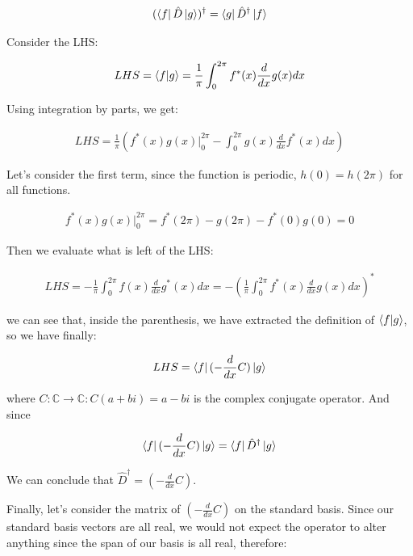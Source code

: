 \documentclass{article}
\begin{document}
\begin{align*}
(\bra{f} {\hat{D}} \ket{g})^{\dagger} = \bra{g}{\hat{D}}^{\dagger} \ket{f} 
\end{align*}

Consider the LHS:

\begin{align*}
LHS = \bra{f}\ket{g} = \frac{1}{\pi} \int_{0}^{2\pi}  f^*(x) \frac{d}{dx} g(x) dx
\end{align*}

Using integration by parts, we get:

\begin{align*}
LHS = \frac{1}{\pi} ( f^*(x) g(x) \Big|^{2\pi}_{0} -  \int^{2\pi}_{0} g(x) \frac{d}{dx} f^*(x) dx)
\end{align*}

Let's consider the first term, since the function is periodic, $h(0) = h(2\pi)$ for all functions.

\begin{align*}
f^*(x) g(x) \Big|^{2\pi}_{0} = f^*( 2\pi) - g(2\pi) - f^*(0) g(0) = 0
\end{align*}

Then we evaluate what is left of the LHS:

\begin{align*}
LHS = - \frac{1}{\pi} \int^{2\pi}_{0} f(x) \frac{d}{dx} g^*(x) dx = - (\frac{1}{\pi} \int^{2\pi}_{0} f^*(x) \frac{d}{dx} g(x) dx)^*
\end{align*}

we can see that, inside the parenthesis, we have extracted the definition of $\bra{f}\ket{g}$, so we have finally:

\begin{align*}
LHS = \bra{f} (-\frac{d}{dx} C) \ket{g}
\end{align*}

where $C: \mathbb{C} \to \mathbb{C} : C(a+bi) = a - bi$ is the complex conjugate operator. And since 

\begin{align*}
\bra{f} (-\frac{d}{dx} C) \ket{g} = \bra{f} \hat{D}^{\dagger} \ket{g}
\end{align*}

We can conclude that $\hat{D}^{\dagger} = (-\frac{d}{dx} C)$.

Finally, let's consider the matrix of $(-\frac{d}{dx} C)$ on the standard basis. Since our standard basis vectors are all real, we would not expect the operator to alter anything since the span of our basis is all real, therefore:
\end{document}
